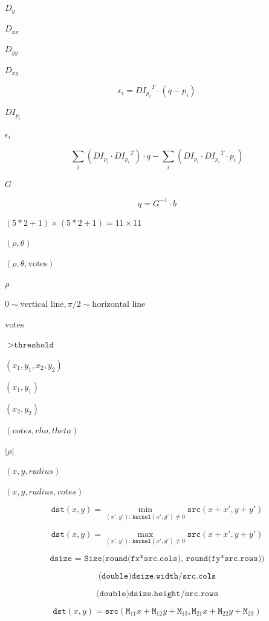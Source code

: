 \documentclass{article}
\begin{document}
$D_y$
\pagebreak

$D_{xx}$
\pagebreak

$D_{yy}$
\pagebreak

$D_{xy}$
\pagebreak

\[\epsilon _i = {DI_{p_i}}^T  \cdot (q - p_i)\]
\pagebreak

${DI_{p_i}}$
\pagebreak

$\epsilon_i$
\pagebreak

\[\sum _i(DI_{p_i}  \cdot {DI_{p_i}}^T) \cdot q -  \sum _i(DI_{p_i}  \cdot {DI_{p_i}}^T  \cdot p_i)\]
\pagebreak

$G$
\pagebreak

\[q = G^{-1}  \cdot b\]
\pagebreak

$(5*2+1) \times (5*2+1) = 11 \times 11$
\pagebreak

$(\rho, \theta)$
\pagebreak

$(\rho, \theta, \textrm{votes})$
\pagebreak

$\rho$
\pagebreak

$0 \sim \textrm{vertical line}, \pi/2 \sim \textrm{horizontal line}$
\pagebreak

$\textrm{votes}$
\pagebreak

$>\texttt{threshold}$
\pagebreak

$(x_1, y_1, x_2, y_2)$
\pagebreak

$(x_1,y_1)$
\pagebreak

$(x_2, y_2)$
\pagebreak

$(votes, rho, theta)$
\pagebreak

$|\rho|$
\pagebreak

$(x, y, radius)$
\pagebreak

$(x, y, radius, votes)$
\pagebreak

\[\texttt{dst} (x,y) =  \min _{(x',y'):  \, \texttt{kernel} (x',y') \ne0 } \texttt{src} (x+x',y+y')\]
\pagebreak

\[\texttt{dst} (x,y) =  \max _{(x',y'):  \, \texttt{kernel} (x',y') \ne0 } \texttt{src} (x+x',y+y')\]
\pagebreak

\[\texttt{dsize = Size(round(fx*src.cols), round(fy*src.rows))}\]
\pagebreak

\[\texttt{(double)dsize.width/src.cols}\]
\pagebreak

\[\texttt{(double)dsize.height/src.rows}\]
\pagebreak

\[\texttt{dst} (x,y) =  \texttt{src} ( \texttt{M} _{11} x +  \texttt{M} _{12} y +  \texttt{M} _{13}, \texttt{M} _{21} x +  \texttt{M} _{22} y +  \texttt{M} _{23})\]
\pagebreak
\end{document}

